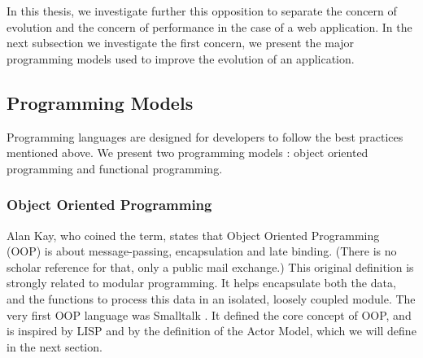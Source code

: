 In this thesis, we investigate further this opposition to separate the concern of evolution and the concern of performance in the case of a web application.
In the next subsection we investigate the first concern, we present the major programming models used to improve the evolution of an application.

\subsection{Programming Models} \label{chapter3:software-design:programming-models}

Programming languages are designed for developers to follow the best practices mentioned above.
We present two programming models : object oriented programming and functional programming.

\subsubsection{Object Oriented Programming}


Alan Kay, who coined the term, states that Object Oriented Programming (OOP) is about message-passing, encapsulation and late binding.
(There is no scholar reference for that, only a public mail exchange.)
This original definition is strongly related to modular programming.
It helps encapsulate both the data, and the functions to process this data in an isolated, loosely coupled module.
The very first OOP language was Smalltalk \cite{Goldberg1984}.
It defined the core concept of OOP, and is inspired by LISP and by the definition of the Actor Model, which we will define in the next section.

